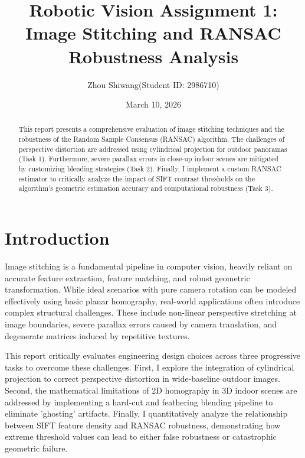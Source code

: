 \documentclass{Resources/UoBLab1}
\begin{document}

    \title{Robotic Vision Assignment 1: \\
    Image Stitching and RANSAC Robustness Analysis}
    \author{Zhou Shiwang(Student ID: 2986710)}
     
    \date{March 10, 2026}

    \maketitle

    \begin{abstract}
        This report presents a comprehensive evaluation of image stitching techniques
        and the robustness of the Random Sample Consensus (RANSAC) algorithm.
        The challenges of perspective distortion are addressed using cylindrical
        projection for outdoor panoramas (Task 1). Furthermore, severe parallax
        errors in close-up indoor scenes are mitigated by customizing blending
        strategies (Task 2). Finally, I implement a custom RANSAC estimator to
        critically analyze the impact of SIFT contrast thresholds on the
        algorithm's geometric estimation accuracy and computational robustness (Task
        3).
    \end{abstract}

    \section{Introduction}

    Image stitching is a fundamental pipeline in computer vision, heavily
    reliant on accurate feature extraction, feature matching, and robust
    geometric transformation. While ideal scenarios with pure camera rotation can
    be modeled effectively using basic planar homography, real-world
    applications often introduce complex structural challenges. These include non-linear
    perspective stretching at image boundaries, severe parallax errors caused by
    camera translation, and degenerate matrices induced by repetitive textures.

    This report critically evaluates engineering design choices across three progressive
    tasks to overcome these challenges. First, I explore the integration of cylindrical
    projection to correct perspective distortion in wide-baseline outdoor images.
    Second, the mathematical limitations of 2D homography in 3D indoor scenes are
    addressed by implementing a hard-cut and feathering blending pipeline to eliminate
    'ghosting' artifacts. Finally, I quantitatively analyze the relationship between
    SIFT feature density and RANSAC robustness, demonstrating how extreme
    threshold values can lead to either false robustness or catastrophic
    geometric failure.
\end{document}
